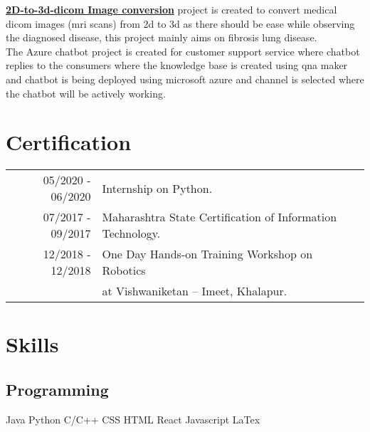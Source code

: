 \documentclass[]{rohan-resume-openfont}
\begin{document}
\begin{minipage}[t]{0.66\textwidth}
 \textbf{\href{https://github.com/rp520671/SEM5-MINI-PROJECT}{2D-to-3d-dicom Image conversion}} project is created to convert medical dicom images (mri scans) from 2d to 3d as there should be ease while observing the diagnosed disease, this project mainly aims on fibrosis lung disease.\\
\sectionsep
{}
The Azure chatbot  project is created for customer support service where chatbot replies to the consumers where the knowledge base is created using qna maker and chatbot is being deployed using microsoft azure and channel is selected where the chatbot will be actively working. 
 \sectionsep


\section{Certification} 
\begin{tabular}{rll}
05/2020 - 06/2020 	       & Internship on Python.\\
07/2017 - 09/2017 &Maharashtra State Certification of Information Technology.\\
12/2018 - 12/2018  &One Day Hands-on Training Workshop on Robotics \\& at Vishwaniketan – Imeet, Khalapur.\\

\end{tabular}
\sectionsep


\section{Skills}
\subsection{Programming}
 \textbullet{} Java  \textbullet{} Python  
  \textbullet{} C/C++  \textbullet{} CSS \textbullet{} HTML \textbullet{} 
  React \textbullet{} Javascript \textbullet{} LaTex \\ 
\sectionsep

\end{minipage}
\end{document}
